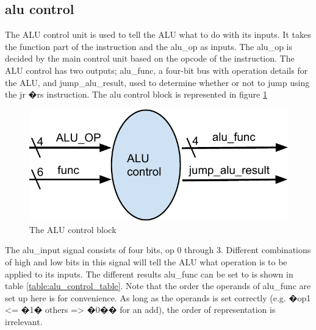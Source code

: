 \subsection*{alu control}

The ALU control unit is used to tell the ALU what to do with its inputs. It takes the function part of the instruction and the alu\_op as inputs. The alu\_op is decided by the main control unit based on the opcode of the instruction. The ALU control has two outputs; alu\_func, a four-bit bus with operation details for the ALU, and jump\_alu\_result, used to determine whether or not to jump using the jr �rs instruction. The alu control block is represented in figure \ref {fig:alu_control}
\begin{figure}
	\label{fig:alu_control}
	\includegraphics{figures/alu_control.pdf}
	\caption{The ALU control block}
\end{figure}

The alu\_input signal consists of four bits, op 0 through 3. Different combinations of high and low bits in this signal will tell the ALU what operation is to be applied to its inputs.  The different results alu\_func can be set to is shown in table \ref{table:alu_control_table}. Note that the order the operands of alu\_func are set up here is for convenience. As long as the operands is set correctly (e.g. �op1 <= �1� others => �0�� for an add), the order of representation is irrelevant. 

